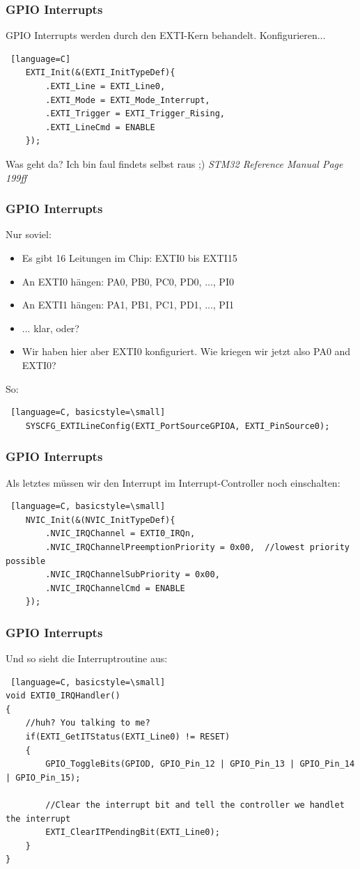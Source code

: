 \documentclass[ngerman,compress]{beamer}
\begin{document}
\begin{frame} [fragile]
	\frametitle{GPIO Interrupts}
	GPIO Interrupts werden durch den EXTI-Kern behandelt. Konfigurieren...
	\begin{lstlisting} [language=C]
	EXTI_Init(&(EXTI_InitTypeDef){
		.EXTI_Line = EXTI_Line0,
		.EXTI_Mode = EXTI_Mode_Interrupt,
		.EXTI_Trigger = EXTI_Trigger_Rising,
		.EXTI_LineCmd = ENABLE
	});
	\end{lstlisting}
	Was geht da? Ich bin faul findets selbst raus ;) \emph{STM32 Reference Manual Page 199ff}
\end{frame}

\begin{frame} [fragile]
	\frametitle{GPIO Interrupts}
	Nur soviel: 
	\begin{itemize}
		\item Es gibt 16 Leitungen im Chip: EXTI0 bis EXTI15
		\item An EXTI0 hängen: PA0, PB0, PC0, PD0, ..., PI0
		\item An EXTI1 hängen: PA1, PB1, PC1, PD1, ..., PI1
		\item ... klar, oder?
		\item Wir haben hier aber EXTI0 konfiguriert. Wie kriegen wir jetzt also PA0 and EXTI0?
	\end{itemize}
	\pause
	So:
	\begin{lstlisting} [language=C, basicstyle=\small]
	SYSCFG_EXTILineConfig(EXTI_PortSourceGPIOA, EXTI_PinSource0);
	\end{lstlisting}
\end{frame}

\begin{frame} [fragile]
	\frametitle{GPIO Interrupts}
	Als letztes müssen wir den Interrupt im Interrupt-Controller noch einschalten:
	\begin{lstlisting} [language=C, basicstyle=\small]
	NVIC_Init(&(NVIC_InitTypeDef){
		.NVIC_IRQChannel = EXTI0_IRQn,
		.NVIC_IRQChannelPreemptionPriority = 0x00,	//lowest priority possible
		.NVIC_IRQChannelSubPriority = 0x00,
		.NVIC_IRQChannelCmd = ENABLE
	});
	\end{lstlisting}
\end{frame}

\begin{frame} [fragile]
	\frametitle{GPIO Interrupts}
	Und so sieht die Interruptroutine aus:
	\begin{lstlisting} [language=C, basicstyle=\small]
void EXTI0_IRQHandler()
{
	//huh? You talking to me?
	if(EXTI_GetITStatus(EXTI_Line0) != RESET)
	{
		GPIO_ToggleBits(GPIOD, GPIO_Pin_12 | GPIO_Pin_13 | GPIO_Pin_14 | GPIO_Pin_15);

		//Clear the interrupt bit and tell the controller we handlet the interrupt
		EXTI_ClearITPendingBit(EXTI_Line0);
	}
}
	\end{lstlisting}
\end{frame}
\end{document}
